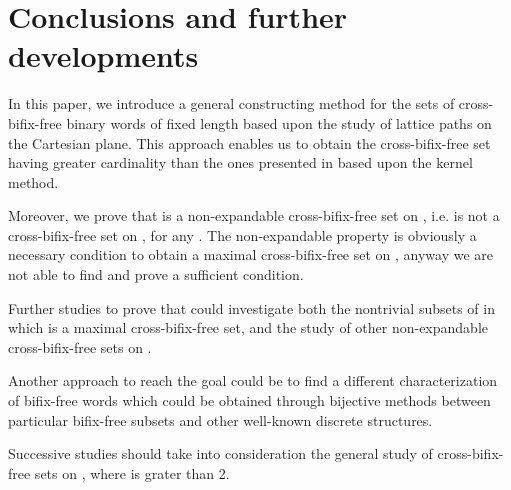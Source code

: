 \documentclass[a4paper,11pt]{article}
\begin{document}
\section{Conclusions and further developments}
In this paper, we introduce a general constructing method for the
sets of cross-bifix-free binary words of fixed length  based
upon the study of lattice paths on the Cartesian plane. This
approach enables us to obtain the cross-bifix-free set 
having greater cardinality than the ones presented in \cite{1}
based upon the kernel method.

Moreover, we prove that  is a non-expandable
cross-bifix-free set on , i.e.  is
not a cross-bifix-free set on , for any . The non-expandable property is
obviously a necessary condition to obtain a maximal
cross-bifix-free set on , anyway we are not able to find
and prove a sufficient condition.

Further studies to prove that could investigate both the
nontrivial subsets of  in which  is a maximal
cross-bifix-free set, and the study of other non-expandable
cross-bifix-free sets on .

Another approach to reach the goal could be to find a different
characterization of bifix-free words which could be obtained
through bijective methods between particular bifix-free subsets
and other well-known discrete structures.

Successive studies should take into consideration the general
study of cross-bifix-free sets on , where  is grater
than 2.
\end{document}
